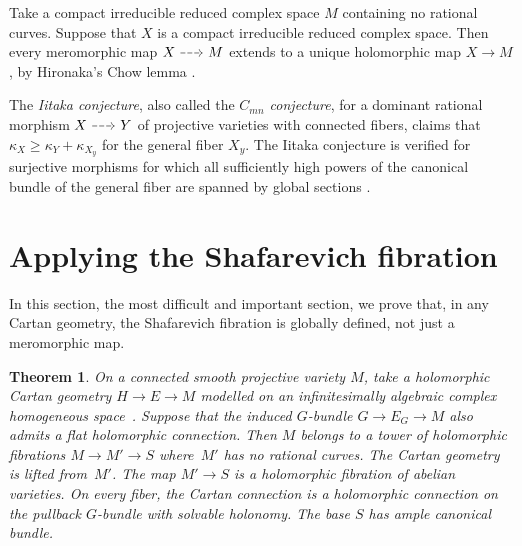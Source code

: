 \documentclass[11pt]{article}
\numberwithin{equation}{section}
\numberwithin{equation}{section}
\newtheorem{Theorem}{Theorem}[section]
\begin{document}
Take a compact irreducible reduced complex space $M$ containing no rational curves.
Suppose that $X$ is a compact irreducible reduced complex space. Then every meromorphic map $\rationalMap{X}{M}$ extends to a unique holomorphic map $X \to M$, by Hironaka's Chow lemma \cite[Corollary~2.9]{Grauert:1994}.

The \emph{Iitaka conjecture}, also called the \emph{$C_{mn}$ conjecture}, for a dominant rational morphism $\rationalMap{X}{Y}$ of projective varieties with connected fibers, claims that $\kappa_X \ge \kappa_Y + \kappa_{X_y}$ for the general fiber $X_y$.
The Iitaka conjecture is verified for surjective morphisms for which all sufficiently high powers of the canonical bundle of the general fiber are spanned by global sections \cite[Corollary~1.2]{Kawamata:1985}.



\section{Applying the Shafarevich fibration}
In this section, the most difficult and important section, we prove that, in any Cartan geometry, the Shafarevich fibration is globally defined, not just a meromorphic map.

\setcounter{Theorem}{1}
\begin{Theorem}\label{theorem:JR}
On a connected smooth projective variety $M$, take a holomorphic Cartan geometry $H\to E \to M$ modelled on an infinitesimally algebraic complex homogeneous space~.
Suppose that the induced $G$-bundle $G \to E_G \to M$ also admits a flat holomorphic connection.
Then $M$ belongs to a tower of holomorphic fibrations $M \to M' \to S$ where~$M'$ has no rational curves.
The Cartan geometry is lifted from~$M'$.
The map $M' \to S$ is a holomorphic fibration of abelian varieties.
On every fiber, the Cartan connection is a holomorphic connection on the pullback $G$-bundle with solvable holonomy.
The base $S$ has ample canonical bundle.
\end{Theorem}
\end{document}
